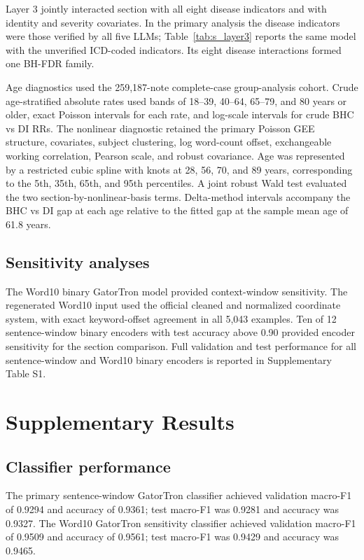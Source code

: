 \documentclass[unnumsec,webpdf,contemporary,large]{oup-authoring-template}
\begin{document}
Layer 3 jointly interacted section with all eight disease indicators and with identity and severity covariates. In the primary analysis the disease indicators were those verified by all five LLMs; Table~\ref{tab:s_layer3} reports the same model with the unverified ICD-coded indicators. Its eight disease interactions formed one BH-FDR family.

Age diagnostics used the 259,187-note complete-case group-analysis cohort. Crude age-stratified absolute rates used bands of 18--39, 40--64, 65--79, and 80 years or older, exact Poisson intervals for each rate, and log-scale intervals for crude BHC vs DI RRs. The nonlinear diagnostic retained the primary Poisson GEE structure, covariates, subject clustering, log word-count offset, exchangeable working correlation, Pearson scale, and robust covariance. Age was represented by a restricted cubic spline with knots at 28, 56, 70, and 89 years, corresponding to the 5th, 35th, 65th, and 95th percentiles. A joint robust Wald test evaluated the two section-by-nonlinear-basis terms. Delta-method intervals accompany the BHC vs DI gap at each age relative to the fitted gap at the sample mean age of 61.8 years.

\subsection{Sensitivity analyses}

The Word10 binary GatorTron model provided context-window sensitivity. The regenerated Word10 input used the official cleaned and normalized coordinate system, with exact keyword-offset agreement in all 5,043 examples. Ten of 12 sentence-window binary encoders with test accuracy above 0.90 provided encoder sensitivity for the section comparison. Full validation and test performance for all sentence-window and Word10 binary encoders is reported in Supplementary Table S1.

\section{Supplementary Results}

\subsection{Classifier performance}

The primary sentence-window GatorTron classifier achieved validation macro-F1 of 0.9294 and accuracy of 0.9361; test macro-F1 was 0.9281 and accuracy was 0.9327. The Word10 GatorTron sensitivity classifier achieved validation macro-F1 of 0.9509 and accuracy of 0.9561; test macro-F1 was 0.9429 and accuracy was 0.9465.
\end{document}
